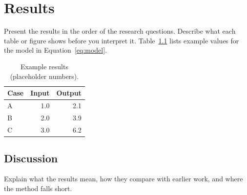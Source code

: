 \chapter{Results}
\label{ch:results}

Present the results in the order of the research questions. Describe what
each table or figure shows before you interpret it. Table~\ref{tab:results}
lists example values for the model in Equation~\eqref{eq:model}.

\begin{table}[htbp]
  \centering
  \begin{tabular}{lrr}
    \toprule
    Case & Input & Output \\
    \midrule
    A & 1.0 & 2.1 \\
    B & 2.0 & 3.9 \\
    C & 3.0 & 6.2 \\
    \bottomrule
  \end{tabular}
  \caption{Example results (placeholder numbers).}
  \label{tab:results}
\end{table}

\section{Discussion}
\label{sec:discussion}

Explain what the results mean, how they compare with earlier work, and
where the method falls short.
